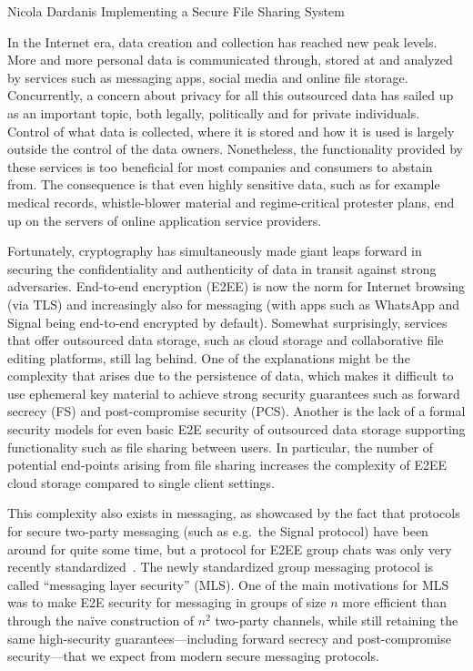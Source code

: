 \documentclass[E]{BAMASA}
\begin{document}
%
{Nicola Dardanis}%
{Implementing a Secure File Sharing System}


\intro
In the Internet era, data creation and collection has reached new peak levels.
More and more personal data is communicated through, stored at and analyzed by services such as messaging apps, social media and online file storage.
Concurrently, a concern about privacy for all this outsourced data has sailed up as an important topic, both legally, politically and for private individuals.
Control of what data is collected, where it is stored and how it is used is largely outside the control of the data owners.
Nonetheless, the functionality provided by these services is too beneficial for most companies and consumers to abstain from.
The consequence is that even highly sensitive data, such as for example medical records, whistle-blower material and regime-critical protester plans, end up on the servers of online application service providers.

Fortunately, cryptography has simultaneously made giant leaps forward in securing the confidentiality and authenticity of data in transit against strong adversaries.
End-to-end encryption (E2EE) is now the norm for Internet browsing (via TLS) and increasingly also for messaging (with apps such as WhatsApp and Signal being end-to-end encrypted by default).
Somewhat surprisingly, services that offer outsourced data storage, such as cloud storage and collaborative file editing platforms, still lag behind.
One of the explanations might be the complexity that arises due to the persistence of data, which makes it difficult to use ephemeral key material to achieve strong security guarantees such as forward secrecy (FS) and post-compromise security (PCS).
Another is the lack of a formal security models for even basic E2E security of outsourced data storage supporting functionality such as file sharing between users.
In particular, the number of potential end-points arising from file sharing increases the complexity of E2EE cloud storage compared to single client settings.

This complexity also exists in messaging, as showcased by the fact that protocols for secure two-party messaging (such as e.g.\ the Signal protocol) have been around for quite some time, but a protocol for E2EE group chats was only very recently standardized~\cite{rfc9420}.
The newly standardized group messaging protocol is called ``messaging layer security'' (MLS).
One of the main motivations for MLS was to make E2E security for messaging in groups of size $n$ more efficient than through the naïve construction of $n^2$ two-party channels, while still retaining the same high-security guarantees---including forward secrecy and post-compromise security---that we expect from modern secure messaging protocols.
\end{document}

